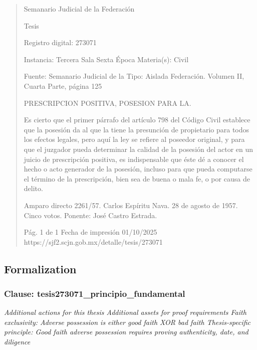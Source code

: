 \documentclass[11pt,a4paper]{article}
\begin{document}
\begin{quote}
                                                   Semanario Judicial de la Federación

                                                  Tesis

 Registro digital: 273071

 Instancia: Tercera Sala          Sexta Época                           Materia(s): Civil

                                  Fuente: Semanario Judicial de la      Tipo: Aislada
                                  Federación.
                                  Volumen II, Cuarta Parte, página
                                  125


PRESCRIPCION POSITIVA, POSESION PARA LA.


Es cierto que el primer párrafo del artículo 798 del Código Civil establece que la posesión da al que
la tiene la presunción de propietario para todos los efectos legales, pero aquí la ley se refiere al
poseedor original, y para que el juzgador pueda determinar la calidad de la posesión del actor en un
juicio de prescripción positiva, es indispensable que éste dé a conocer el hecho o acto generador de
la posesión, incluso para que pueda computarse el término de la prescripción, bien sea de buena o
mala fe, o por causa de delito.


Amparo directo 2261/57. Carlos Espíritu Nava. 28 de agosto de 1957. Cinco votos. Ponente: José
Castro Estrada.




                                             Pág. 1 de 1             Fecha de impresión 01/10/2025
  https://sjf2.scjn.gob.mx/detalle/tesis/273071

\end{quote}

\subsection{Formalization}

\subsubsection{Clause: tesis273071\_principio\_fundamental}

\textit{Additional actions for this thesis Additional assets for proof requirements Faith exclusivity: Adverse possession is either good faith XOR bad faith Thesis-specific principle: Good faith adverse possession requires proving authenticity, date, and diligence}
\end{document}
